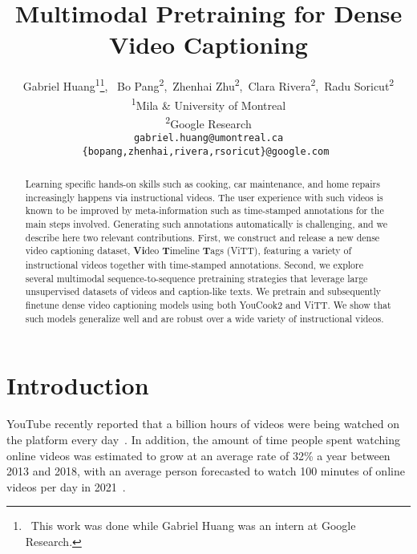 \documentclass[11pt,a4paper]{article}
\title{Multimodal Pretraining for Dense Video Captioning}
\author{Gabriel Huang\textsuperscript{1}\thanks{\, This work was done while Gabriel Huang was an intern at Google Research.},
\, Bo Pang\textsuperscript{2},
\,Zhenhai Zhu\textsuperscript{2},
\,Clara Rivera\textsuperscript{2},
\,Radu Soricut\textsuperscript{2}\\
\textsuperscript{1}Mila \& University of Montreal\\
\textsuperscript{2}Google Research\\
\small
\texttt{gabriel.huang@umontreal.ca}\\
\small
\texttt{\{bopang,zhenhai,rivera,rsoricut\}@google.com }
}
\date{}
\begin{document}
\maketitle

\newcommand{\ldvm}{ViTT\xspace}
\newcommand{\ldvmlong}{Video Timeline Tags\xspace}
\newcommand{\ldvmmerged}{\ldvm-All\xspace}
\newcommand{\ldvmcooking}{\ldvm-Cooking\xspace}
\newcommand{\youcook}{YouCook2\xspace}
\newcommand{\ytdata}{YouTube-8M\xspace}
\newcommand{\ytdatasub}{YT8M-cook\xspace}
\newcommand{\youtube}{\ytdatasub\xspace}
\newcommand{\howtodata}{HowTo100M\xspace}
\newcommand{\howto}{HowTo100M\xspace}
\newcommand{\recipes}{Recipe1M\xspace}
\newcommand{\wikihow}{WikiHow\xspace}
\newcommand{\starburst}{Compact 2D\xspace}
\newcommand{\fnet}{FDense\xspace}
\newcommand{\unimt}{UniD\xspace}
\newcommand{\bimt}{BiD\xspace}
\newcommand{\bimtalt}{BiDalt\xspace}
\newcommand{\rouge}{{\sc{Rouge}}-L\xspace}
\newcommand{\bleu}{{\sc{Bleu}}\xspace}
\newcommand{\meteor}{{\sc{Meteor}}\xspace}
\newcommand{\cider}{{\sc{CIDEr}}\xspace}
\newcommand{\ASRtoASR}{\textsc{asr}$\to$\textsc{asr}\xspace}
\newcommand{\CAPtoCAP}{\textsc{cap}$\to$\textsc{cap}\xspace}
\newcommand{\ex}[4]{\adjustimage{width=0.19\textwidth,valign=M,frame}{#1}&\textit{#2}&\textit{#3}&\textit{#4}}
\newcommand{\good}{\textcolor{green!70!black}{(\textbf{good})}}
\newcommand{\ok}{\textcolor{orange}{(\textbf{ok})}}
\newcommand{\bad}{\textcolor{red}{(\textbf{bad})}} 
\begin{abstract}
Learning specific hands-on skills such as cooking, car maintenance, and home repairs increasingly happens via instructional videos.
The user experience with such videos is known to be improved by meta-information such as time-stamped annotations for the main steps involved.
Generating such annotations automatically is challenging, and we describe here two relevant contributions.
First, we construct and release a new dense video captioning dataset, \textbf{Vi}deo \textbf{T}imeline \textbf{T}ags (\ldvm), featuring a variety of instructional videos together with time-stamped annotations.
Second, we explore several multimodal sequence-to-sequence pretraining strategies that leverage large unsupervised datasets of videos and caption-like texts.
We pretrain and subsequently finetune dense video captioning models using both YouCook2 and ViTT.
We show that such models generalize well and are robust over a wide variety of instructional videos.
\end{abstract}


\section{Introduction}
YouTube recently reported that a billion hours of videos were being watched on the platform every day~\citep{youtubeblog}.
In addition, the amount of time people spent watching online videos was estimated to grow at an average rate of 32\% a year between 2013 and 2018, with an average person forecasted to watch 100 minutes of online videos per day in 2021~\citep{zenithmedia}.
\end{document}
